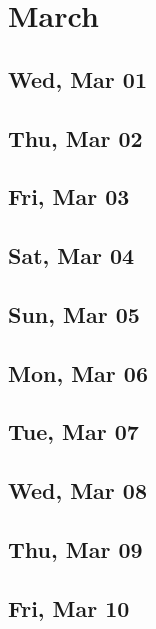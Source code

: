 \chapter{March}
	\section{Wed, Mar 01}
		
	\section{Thu, Mar 02}
		
	\section{Fri, Mar 03}
		
	\section{Sat, Mar 04}
		
	\section{Sun, Mar 05}
		
	\section{Mon, Mar 06}
		
	\section{Tue, Mar 07}
		
	\section{Wed, Mar 08}
		
	\section{Thu, Mar 09}
		
	\section{Fri, Mar 10}
		
